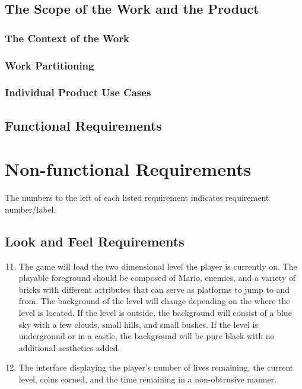 \documentclass[12pt, titlepage]{article}
\begin{document}
\subsection{The Scope of the Work and the Product}

\subsubsection{The Context of the Work}

\subsubsection{Work Partitioning}

\subsubsection{Individual Product Use Cases}

\subsection{Functional Requirements}

\section{Non-functional Requirements}
The numbers to the left of each listed requirement indicates requirement number/label.

\subsection{Look and Feel Requirements}
\begin{enumerate}
\setcounter{enumi}{10}
	\item The game will load the two dimensional level the player is currently on. The playable foreground should be composed of Mario, enemies, and a variety of bricks with different attributes that can serve as platforms to jump to and from. The background of the level will change depending on the where the level is located. If the level is outside, the background will consist of a blue sky with a few clouds, small hills, and small bushes. If the level is underground or in a castle, the background will be pure black with no additional aesthetics added.
	\item The interface displaying the player's number of lives remaining, the current level, coins earned, and the time remaining in a non-obtrusive manner.
\end{enumerate}
\end{document}
